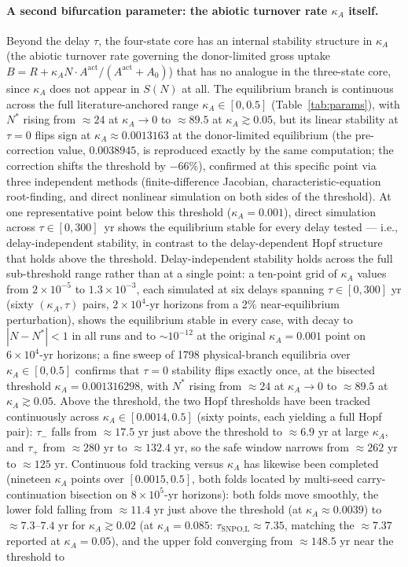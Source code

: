 \documentclass[twocolumn,10pt]{article}
\begin{document}
\paragraph{A second bifurcation parameter: the abiotic turnover rate $\kappa_A$ itself.} Beyond the delay $\tau$, the four-state core has an internal stability structure in $\kappa_A$ (the abiotic turnover rate governing the donor-limited gross uptake $B=R+\kappa_A N\cdot A^{\text{act}}/(A^{\text{act}}+A_0)$) that has no analogue in the three-state core, since $\kappa_A$ does not appear in $S(N)$ at all. The equilibrium branch is continuous across the full literature-anchored range $\kappa_A\in[0,0.5]$ (Table~\ref{tab:params}), with $N^*$ rising from $\approx24$ at $\kappa_A\to0$ to $\approx89.5$ at $\kappa_A\gtrsim0.05$, but its linear stability at $\tau=0$ flips sign at $\kappa_A\approx0.0013163$ at the donor-limited equilibrium (the pre-correction value, $0.0038945$, is reproduced exactly by the same computation; the correction shifts the threshold by $-66\%$), confirmed at this specific point via three independent methods (finite-difference Jacobian, characteristic-equation root-finding, and direct nonlinear simulation on both sides of the threshold). At one representative point below this threshold ($\kappa_A=0.001$), direct simulation across $\tau\in[0,300]$~yr shows the equilibrium stable for every delay tested --- i.e., delay-independent stability, in contrast to the delay-dependent Hopf structure that holds above the threshold. Delay-independent stability holds across the full sub-threshold range rather than at a single point: a ten-point grid of $\kappa_A$ values from $2\times10^{-5}$ to $1.3\times10^{-3}$, each simulated at six delays spanning $\tau\in[0,300]$ yr (sixty $(\kappa_A,\tau)$ pairs, $2\times10^4$-yr horizons from a 2\% near-equilibrium perturbation), shows the equilibrium stable in every case, with decay to $|N-N^*|<1$ in all runs and to $\sim10^{-12}$ at the original $\kappa_A=0.001$ point on $6\times10^4$-yr horizons; a fine sweep of 1798 physical-branch equilibria over $\kappa_A\in[0,0.5]$ confirms that $\tau=0$ stability flips exactly once, at the bisected threshold $\kappa_A=0.001316298$, with $N^*$ rising from $\approx24$ at $\kappa_A\to0$ to $\approx89.5$ at $\kappa_A\gtrsim0.05$. Above the threshold, the two Hopf thresholds have been tracked continuously across $\kappa_A\in[0.0014,0.5]$ (sixty points, each yielding a full Hopf pair): $\tau_-$ falls from $\approx17.5$ yr just above the threshold to $\approx6.9$ yr at large $\kappa_A$, and $\tau_+$ from $\approx280$ yr to $\approx132.4$ yr, so the safe window narrows from $\approx262$ yr to $\approx125$ yr. Continuous fold tracking versus $\kappa_A$ has likewise been completed (nineteen $\kappa_A$ points over $[0.0015,0.5]$, both folds located by multi-seed carry-continuation bisection on $8\times10^5$-yr horizons): both folds move smoothly, the lower fold falling from $\approx11.4$ yr just above the threshold (at $\kappa_A\approx0.0039$) to $\approx7.3$--$7.4$ yr for $\kappa_A\gtrsim0.02$ (at $\kappa_A=0.085$: $\tau_{\text{SNPO,L}}\approx7.35$, matching the $\approx7.37$ reported at $\kappa_A=0.05$), and the upper fold converging from $\approx148.5$ yr near the threshold to 
\end{document}
